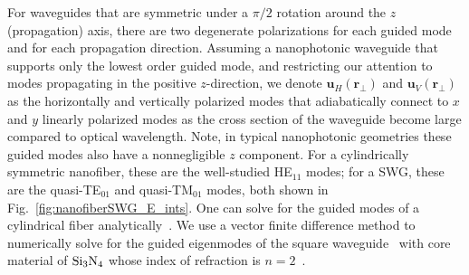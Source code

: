 \documentclass[preprint,aps,pra,onecolumn,superscriptaddress]{revtex4-1} %
\newcommand{\mbf}[1]{\mathbf{#1}}
\begin{document}
For waveguides that are symmetric under a $\pi/2$ rotation around the $z$ (propagation) axis, there are two degenerate polarizations for each guided mode and for each propagation direction.  Assuming a nanophotonic waveguide that supports only the lowest order guided mode, and restricting our attention to modes propagating in the positive $z$-direction, we denote $\mbf{u}_H(\mbf{r}_\perp)$ and  $\mbf{u}_V(\mbf{r}_\perp)$ as the horizontally and vertically polarized modes that adiabatically connect to $x$ and $y$ linearly polarized modes as the cross section of the waveguide become large compared to optical wavelength.  Note, in typical nanophotonic geometries these guided modes also have a nonnegligible $z$ component.  For a cylindrically symmetric nanofiber, these are the well-studied HE$_{11}$ modes; for a SWG, these are the quasi-TE$_{01}$ and quasi-TM$_{01}$ modes, both shown in Fig.~\eqref{fig:nanofiberSWG_E_ints}. One can solve for the guided modes of a cylindrical fiber analytically~\cite{Kien2004,Vetsch2010Opticala,Qi2016}. We use a vector finite difference method to numerically solve for the guided eigenmodes of the square waveguide~\cite{Fallahkhair2008} with core material of $ \rm{Si}_3\rm{N}_4 $ whose index of refraction is $ n=2 $~\cite{Lee2013}. 
\end{document}

